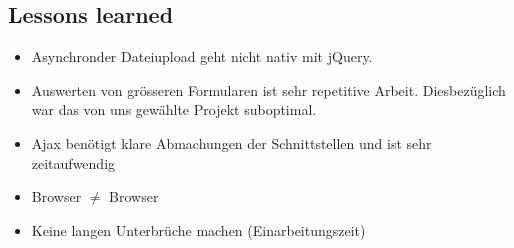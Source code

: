 \documentclass[ngerman, 12pt, pdftex]{scrartcl}[2006/07/30]
\begin{document}
\subsection{Lessons learned}
\begin{itemize}
\item Asynchronder Dateiupload geht nicht nativ mit jQuery.
\item Auswerten von grösseren Formularen ist sehr repetitive Arbeit. Diesbezüglich war das von uns gewählte Projekt suboptimal.
\item Ajax benötigt klare Abmachungen der Schnittstellen und ist sehr zeitaufwendig
\item Browser $\neq$ Browser
\item Keine langen Unterbrüche machen (Einarbeitungszeit)
\end{itemize}


\end{document}
